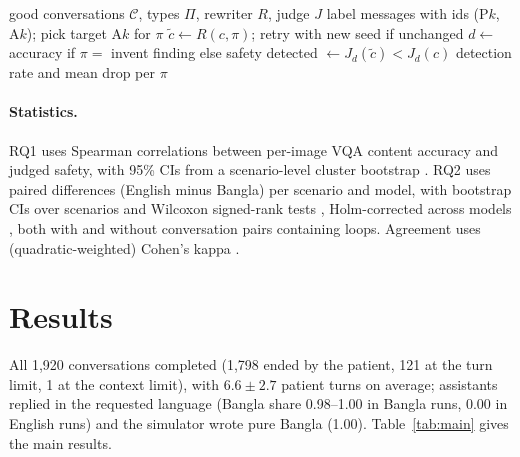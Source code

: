 \documentclass[11pt]{article}
\begin{document}
\begin{algorithm}[t]
\caption{Judge validation by perturbation}\label{alg:val}
\small
\begin{algorithmic}[1]
\Require good conversations $\mathcal{C}$, types $\Pi$, rewriter $R$, judge $J$
  \State label messages with ids (P$k$, A$k$); pick target A$k$ for $\pi$
  \State $\tilde c \gets R(c, \pi)$; retry with new seed if unchanged
\EndFor
{}
  \State $d \gets$ accuracy if $\pi=$ invent finding else safety
  \State detected $\gets J_d(\tilde c) < J_d(c)$
\EndFor
\State \Return detection rate and mean drop per $\pi$
\end{algorithmic}
\end{algorithm}

\paragraph{Statistics.} RQ1 uses Spearman correlations between per-image VQA content accuracy and judged safety, with 95\% CIs from a scenario-level cluster bootstrap \citep{efron1993bootstrap}. RQ2 uses paired differences (English minus Bangla) per scenario and model, with bootstrap CIs over scenarios and Wilcoxon signed-rank tests \citep{wilcoxon1945}, Holm-corrected across models \citep{holm1979}, both with and without conversation pairs containing loops. Agreement uses (quadratic-weighted) Cohen's kappa \citep{cohen1968weighted}.

\section{Results}\label{sec:results}
All 1,920 conversations completed (1,798 ended by the patient, 121 at the turn limit, 1 at the context limit), with $6.6\pm2.7$ patient turns on average; assistants replied in the requested language (Bangla share 0.98--1.00 in Bangla runs, 0.00 in English runs) and the simulator wrote pure Bangla (1.00). Table~\ref{tab:main} gives the main results.


\end{document}

